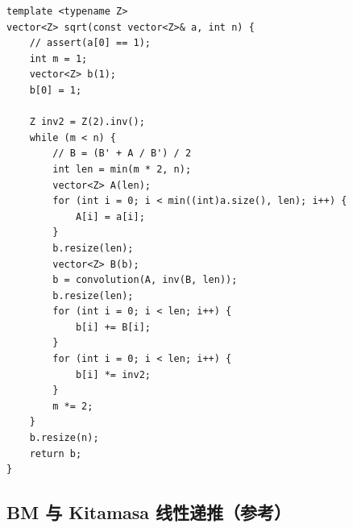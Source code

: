 \begin{lstlisting}
template <typename Z>
vector<Z> sqrt(const vector<Z>& a, int n) {
    // assert(a[0] == 1);
    int m = 1;
    vector<Z> b(1);
    b[0] = 1;

    Z inv2 = Z(2).inv();
    while (m < n) {
        // B = (B' + A / B') / 2
        int len = min(m * 2, n);
        vector<Z> A(len);
        for (int i = 0; i < min((int)a.size(), len); i++) {
            A[i] = a[i];
        }
        b.resize(len);
        vector<Z> B(b);
        b = convolution(A, inv(B, len));
        b.resize(len);
        for (int i = 0; i < len; i++) {
            b[i] += B[i];
        }
        for (int i = 0; i < len; i++) {
            b[i] *= inv2;
        }
        m *= 2;
    }
    b.resize(n);
    return b;
}
\end{lstlisting}

\subsection{BM 与 Kitamasa 线性递推（参考）}
\par

